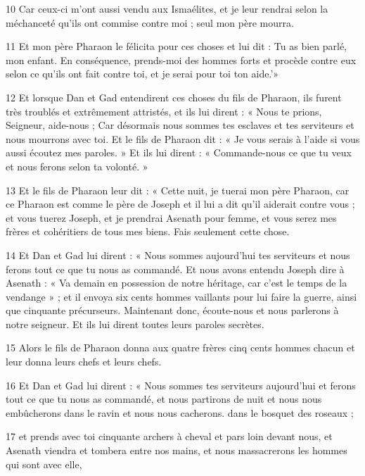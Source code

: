 \par 10 Car ceux-ci m'ont aussi vendu aux Ismaélites, et je leur rendrai selon la méchanceté qu'ils ont commise contre moi ; seul mon père mourra.

\par 11 Et mon père Pharaon le félicita pour ces choses et lui dit : Tu as bien parlé, mon enfant. En conséquence, prends-moi des hommes forts et procède contre eux selon ce qu'ils ont fait contre toi, et je serai pour toi ton aide.'»

\par 12 Et lorsque Dan et Gad entendirent ces choses du fils de Pharaon, ils furent très troublés et extrêmement attristés, et ils lui dirent : « Nous te prions, Seigneur, aide-nous ; Car désormais nous sommes tes esclaves et tes serviteurs et nous mourrons avec toi. Et le fils de Pharaon dit : « Je vous serais à l'aide si vous aussi écoutez mes paroles. » Et ils lui dirent : « Commande-nous ce que tu veux et nous ferons selon ta volonté. »

\par 13 Et le fils de Pharaon leur dit : « Cette nuit, je tuerai mon père Pharaon, car ce Pharaon est comme le père de Joseph et il lui a dit qu'il aiderait contre vous ; et vous tuerez Joseph, et je prendrai Asenath pour femme, et vous serez mes frères et cohéritiers de tous mes biens. Fais seulement cette chose.

\par 14 Et Dan et Gad lui dirent : « Nous sommes aujourd'hui tes serviteurs et nous ferons tout ce que tu nous as commandé. Et nous avons entendu Joseph dire à Asenath : « Va demain en possession de notre héritage, car c'est le temps de la vendange » ; et il envoya six cents hommes vaillants pour lui faire la guerre, ainsi que cinquante précurseurs. Maintenant donc, écoute-nous et nous parlerons à notre seigneur. Et ils lui dirent toutes leurs paroles secrètes.

\par 15 Alors le fils de Pharaon donna aux quatre frères cinq cents hommes chacun et leur donna leurs chefs et leurs chefs.

\par 16 Et Dan et Gad lui dirent : « Nous sommes tes serviteurs aujourd'hui et ferons tout ce que tu nous as commandé, et nous partirons de nuit et nous nous embûcherons dans le ravin et nous nous cacherons. dans le bosquet des roseaux ;

\par 17 et prends avec toi cinquante archers à cheval et pars loin devant nous, et Asenath viendra et tombera entre nos mains, et nous massacrerons les hommes qui sont avec elle,

